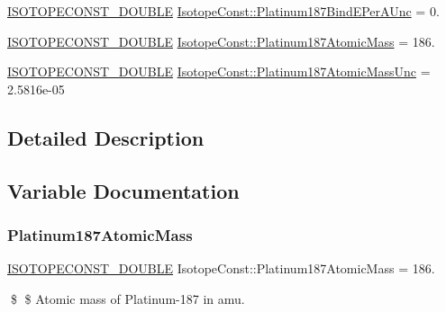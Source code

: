 \begin{DoxyCompactItemize}
\mbox{\hyperlink{group___isotope_const-_macros_ga8f45a7272ce02c0b4c65c44636ed719a}{I\+S\+O\+T\+O\+P\+E\+C\+O\+N\+S\+T\+\_\+\+D\+O\+U\+B\+LE}} \mbox{\hyperlink{group___isotope_const-_platinum-_pt187_gad3568f0565151227081675b67d4835d6}{Isotope\+Const\+::\+Platinum187\+Bind\+E\+Per\+A\+Unc}} = 0.
\item 
\mbox{\hyperlink{group___isotope_const-_macros_ga8f45a7272ce02c0b4c65c44636ed719a}{I\+S\+O\+T\+O\+P\+E\+C\+O\+N\+S\+T\+\_\+\+D\+O\+U\+B\+LE}} \mbox{\hyperlink{group___isotope_const-_platinum-_pt187_ga7984a9259d35affa4f7e32d6a7fb71a1}{Isotope\+Const\+::\+Platinum187\+Atomic\+Mass}} = 186.
\item 
\mbox{\hyperlink{group___isotope_const-_macros_ga8f45a7272ce02c0b4c65c44636ed719a}{I\+S\+O\+T\+O\+P\+E\+C\+O\+N\+S\+T\+\_\+\+D\+O\+U\+B\+LE}} \mbox{\hyperlink{group___isotope_const-_platinum-_pt187_ga5e8c82bb66598842c2586eee03634e36}{Isotope\+Const\+::\+Platinum187\+Atomic\+Mass\+Unc}} = 2.\+5816e-\/05
\end{DoxyCompactItemize}


\subsection{Detailed Description}


\subsection{Variable Documentation}
\mbox{\label{group___isotope_const-_platinum-_pt187_ga7984a9259d35affa4f7e32d6a7fb71a1}} 
\subsubsection{\texorpdfstring{Platinum187\+Atomic\+Mass}{Platinum187AtomicMass}}
{\footnotesize\ttfamily \mbox{\hyperlink{group___isotope_const-_macros_ga8f45a7272ce02c0b4c65c44636ed719a}{I\+S\+O\+T\+O\+P\+E\+C\+O\+N\+S\+T\+\_\+\+D\+O\+U\+B\+LE}} Isotope\+Const\+::\+Platinum187\+Atomic\+Mass = 186.}

\$ \$ Atomic mass of Platinum-\/187 in amu. \mbox{\label{group___isotope_const-_platinum-_pt187_ga5e8c82bb66598842c2586eee03634e36}} 
